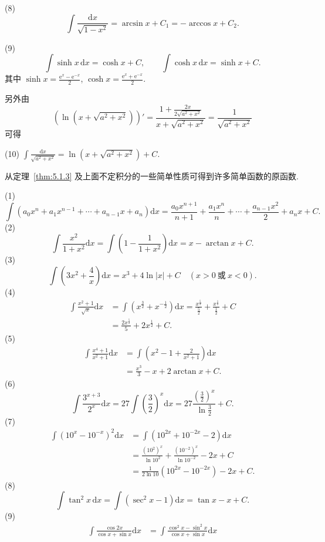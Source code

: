 (8)
\[
\int\frac{\mathrm{d}x}{\sqrt{1-x^{2}}}=\arcsin x+C_{1}=-\arccos x+C_{2}.
\]

(9)
\[
\int\sinh x\,\mathrm{d}x=\cosh x+C,\qquad
\int\cosh x\,\mathrm{d}x=\sinh x+C.
\]
其中 $\sinh x=\frac{\mathrm{e}^{x}-\mathrm{e}^{-x}}{2}$, $\cosh x=\frac{\mathrm{e}^{x}+\mathrm{e}^{-x}}{2}$.

另外由
\[
\left(\ln(x+\sqrt{a^{2}+x^{2}})\right)'=\frac{1+\frac{2x}{2\sqrt{a^{2}+x^{2}}}}{x+\sqrt{a^{2}+x^{2}}}=\frac{1}{\sqrt{a^{2}+x^{2}}}
\]
可得

(10) $\int\frac{\mathrm{d}x}{\sqrt{a^{2}+x^{2}}}=\ln(x+\sqrt{a^{2}+x^{2}})+C$.

从定理~\ref{thm:5.1.3} 及上面不定积分的一些简单性质可得到许多简单函数的原函数.

\begin{example}\label{ex:5.1.4}
(1)
\[
\int(a_{0}x^{n}+a_{1}x^{n-1}+\cdots+a_{n-1}x+a_{n})\mathrm{d}x
=\frac{a_{0}x^{n+1}}{n+1}+\frac{a_{1}x^{n}}{n}+\cdots+\frac{a_{n-1}x^{2}}{2}+a_{n}x+C.
\]
(2)
\[
\int\frac{x^{2}}{1+x^{2}}\mathrm{d}x=\int\left(1-\frac{1}{1+x^{2}}\right)\mathrm{d}x=x-\arctan x+C.
\]
(3)
\[
\int\left(3x^{2}+\frac{4}{x}\right)\mathrm{d}x=x^{3}+4\ln|x|+C\quad (x>0\ \text{或}\ x<0).
\]
(4)
\begin{align*}
\int\frac{x^{2}+1}{\sqrt{x}}\mathrm{d}x&=\int\left(x^{\frac{3}{2}}+x^{-\frac{1}{2}}\right)\mathrm{d}x
=\frac{x^{\frac{5}{2}}}{\frac{5}{2}}+\frac{x^{\frac{1}{2}}}{\frac{1}{2}}+C\\
&=\frac{2x^{\frac{5}{2}}}{5}+2x^{\frac{1}{2}}+C.
\end{align*}
(5)
\begin{align*}
\int\frac{x^{4}+1}{x^{2}+1}\mathrm{d}x&=\int\left(x^{2}-1+\frac{2}{x^{2}+1}\right)\mathrm{d}x\\
&=\frac{x^{3}}{3}-x+2\arctan x+C.
\end{align*}
(6)
\[
\int\frac{3^{x+3}}{2^{x}}\mathrm{d}x=27\int\left(\frac{3}{2}\right)^{x}\mathrm{d}x
=27\frac{\left(\frac{3}{2}\right)^{x}}{\ln\frac{3}{2}}+C.
\]
(7)
\begin{align*}
\int(10^{x}-10^{-x})^{2}\mathrm{d}x&=\int(10^{2x}+10^{-2x}-2)\mathrm{d}x\\
&=\frac{(10^{2})^{x}}{\ln 10^{2}}+\frac{(10^{-2})^{x}}{\ln 10^{-2}}-2x+C\\
&=\frac{1}{2\ln 10}(10^{2x}-10^{-2x})-2x+C.
\end{align*}
(8)
\[
\int\tan^{2}x\,\mathrm{d}x=\int(\sec^{2}x-1)\mathrm{d}x=\tan x-x+C.
\]
(9)
\begin{align*}
\int\frac{\cos 2x}{\cos x+\sin x}\mathrm{d}x&=\int\frac{\cos^{2}x-\sin^{2}x}{\cos x+\sin x}\mathrm{d}x\\

\end{align*}
\end{example}
